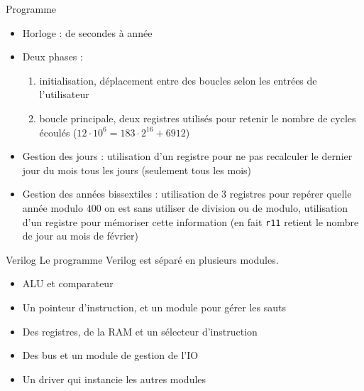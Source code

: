 \documentclass{beamer}
\begin{document}
\begin{frame}[fragile]{Programme}
    \begin{itemize}
        \item Horloge : de secondes à année
        \item Deux phases :
            \begin{enumerate}
            \item initialisation, déplacement entre des boucles selon les entrées de l'utilisateur
            \item boucle principale, deux registres utilisés pour retenir le nombre de cycles écoulés ($12 \cdot 10^6 = 183 \cdot 2^16 + 6912$)
            \end{enumerate}

        \item Gestion des jours : utilisation d'un registre pour ne pas recalculer le dernier jour du mois tous les jours (seulement tous les mois)
        \item Gestion des années bissextiles : utilisation de 3 registres pour repérer quelle année modulo 400 on est sans utiliser de division ou de modulo, utilisation d'un registre pour mémoriser cette information (en fait \verb+r11+ retient le nombre de jour au mois de février)
    \end{itemize}
\end{frame}

\begin{frame}{Verilog}
    Le programme Verilog est séparé en plusieurs modules.
    \begin{itemize}
        \item ALU et comparateur
        \item Un pointeur d'instruction, et un module pour gérer les sauts
        \item Des registres, de la RAM et un sélecteur d'instruction
        \item Des bus et un module de gestion de l'IO
        \item Un driver qui instancie les autres modules
    \end{itemize}
\end{frame}
\end{document}
